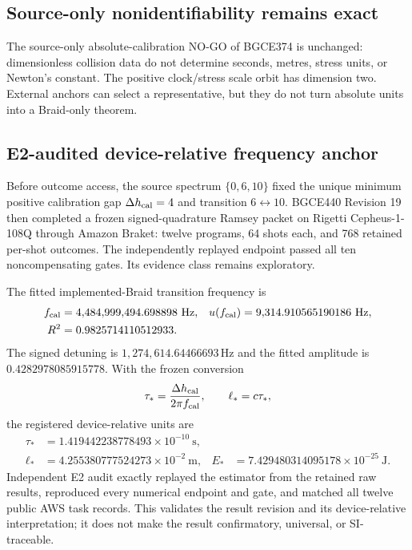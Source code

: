\documentclass[11pt]{article}
\theoremstyle{definition}
\theoremstyle{remark}
\begin{document}
\subsection{Source-only nonidentifiability remains exact}

The source-only absolute-calibration NO-GO of BGCE374 is unchanged: dimensionless collision data do not determine seconds, metres, stress units, or Newton's constant. The positive clock/stress scale orbit has dimension two. External anchors can select a representative, but they do not turn absolute units into a Braid-only theorem.

\subsection{E2-audited device-relative frequency anchor}

Before outcome access, the source spectrum $\{0,6,10\}$ fixed the unique minimum positive calibration gap $\Delta h_{\rm cal}=4$ and transition $6\leftrightarrow10$. BGCE440 Revision 19 then completed a frozen signed-quadrature Ramsey packet on Rigetti Cepheus-1-108Q through Amazon Braket: twelve programs, 64 shots each, and 768 retained per-shot outcomes. The independently replayed endpoint passed all ten noncompensating gates. Its evidence class remains exploratory.

The fitted implemented-Braid transition frequency is
\begin{align}
 f_{\rm cal}&=4{,}484{,}999{,}494.698898\ \mathrm{Hz},
 &u(f_{\rm cal})&=9{,}314.910565190186\ \mathrm{Hz},\\
 R^2&=0.9825714110512933.
\end{align}
The signed detuning is $1,274,614.64466693\,\mathrm{Hz}$ and the fitted amplitude is $0.4282978085915778$. With the frozen conversion
\begin{equation}
 \tau_* = \frac{\Delta h_{\rm cal}}{2\pi f_{\rm cal}},
 \qquad \ell_*=c\tau_*,
\end{equation}
the registered device-relative units are
\begin{align}
 \tau_*&=1.419442238778493\times10^{-10}\ \mathrm{s},\\
 \ell_*&=4.255380777524273\times10^{-2}\ \mathrm{m},
 &E_*&=7.429480314095178\times10^{-25}\ \mathrm{J}.
\end{align}
Independent E2 audit exactly replayed the estimator from the retained raw results, reproduced every numerical endpoint and gate, and matched all twelve public AWS task records. This validates the result revision and its device-relative interpretation; it does not make the result confirmatory, universal, or SI-traceable.
\end{document}
